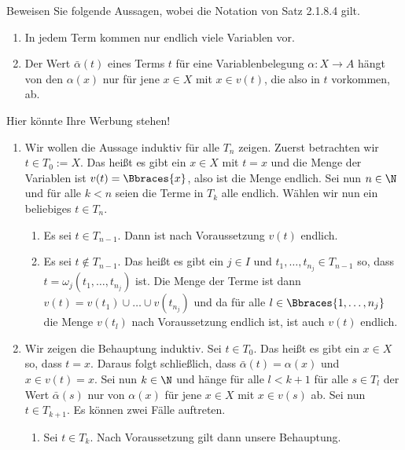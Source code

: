 \begin{exercise}
    Beweisen Sie folgende Aussagen, wobei die Notation von Satz 2.1.8.4 gilt. 
    \begin{enumerate}[label = \arabic*.]
        \item In jedem Term kommen  nur endlich viele Variablen vor.
        \item Der Wert $\bar{\alpha}(t)$ eines Terms $t$ für eine Variablenbelegung $\alpha: X \to A$ hängt von den $\alpha(x)$ nur für jene $x \in X$ mit $x \in v(t)$, die also in $t$ vorkommen, ab.
    \end{enumerate}
\end{exercise}

\begin{solution} 
    Hier könnte Ihre Werbung stehen!
    \begin{enumerate}[label = \arabic*.]
        \item Wir wollen die Aussage induktiv für alle $T_n$ zeigen. Zuerst betrachten wir $t \in T_0 := X$. Das heißt es gibt ein $x \in X$ mit $t = x$ und die Menge der Variablen ist $v(t) = \Bbraces{x}$, also ist die Menge endlich. Sei nun $n \in \N$ und für alle $k < n$ seien die Terme in $T_k$ alle endlich. Wählen wir nun ein beliebiges $t \in T_n$. 
        \begin{enumerate}[label = Fall \arabic*:]
            \item Es sei $t \in T_{n-1}$. Dann ist nach Voraussetzung $v(t)$ endlich.
            \item Es sei $t \notin T_{n-1}$. Das heißt es gibt ein $j \in I$ und $t_1, \dots, t_{n_j} \in T_{n-1}$ so, dass $t = \omega_j(t_1, \dots, t_{n_j})$ ist. Die Menge der Terme ist dann $v(t) = v(t_1) \cup \dots \cup v(t_{n_j})$ und da für alle $l \in \Bbraces{1, \dots, n_j}$ die Menge $v(t_l)$ nach Voraussetzung endlich ist, ist auch $v(t)$ endlich. 
        \end{enumerate}
        \item Wir zeigen die Behauptung induktiv. Sei $t \in T_0$. Das heißt es gibt ein $x \in X$ so, dass $t = x$. Daraus folgt schließlich, dass $\bar{\alpha}(t) = \alpha(x)$ und $x \in v(t) = {x}$. Sei nun $k \in \N$ und hänge für alle $l < k+1$ für alle $s \in T_l$ der Wert $\bar{\alpha}(s)$ nur von $\alpha(x)$ für jene $x \in X$ mit $x \in v(s)$ ab. Sei nun $t \in T_{k+1}$. Es können zwei Fälle auftreten.
        \begin{enumerate}[label = Fall \arabic*:]
            \item Sei $t \in T_k$. Nach Voraussetzung gilt dann unsere Behauptung.

\end{enumerate}
\end{enumerate}
\end{solution}
